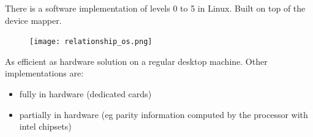 \documentclass[a4paper,10pt]{report}
\begin{document}
There is a software implementation of levels 0 to 5 in Linux.
Built on top of the device mapper.

\begin{figure}[h!]
  \begin{center}
    \texttt{[image: relationship\_os.png]}
    \caption{}
  \end{center}
\end{figure}

As efficient as hardware solution on a regular desktop machine.
Other implementations are:

\begin{itemize}
  \item fully in hardware (dedicated cards)
  \item partially in hardware (eg parity information computed by the processor with intel chipsets)
\end{itemize}
\end{document}
